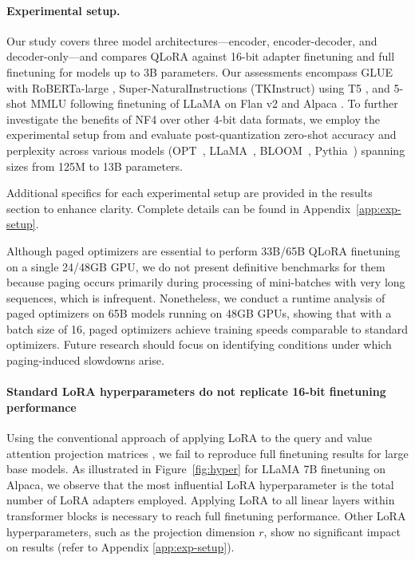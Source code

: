 \paragraph{Experimental setup.} Our study covers three model architectures—encoder, encoder-decoder, and decoder-only—and compares QLoRA against 16-bit adapter finetuning and full finetuning for models up to 3B parameters. Our assessments encompass GLUE \citep{wang2018glue} with RoBERTa-large \citep{liu2019roberta}, Super-NaturalInstructions (TKInstruct) \citep{wang2022super} using T5 \citep{t5}, and 5-shot MMLU \citep{hendrycksmeasuring} following finetuning of LLaMA on Flan v2 \citep{longpre2023flan} and Alpaca \citep{alpaca}. To further investigate the benefits of NF4 over other 4-bit data formats, we employ the experimental setup from \citet{dettmers2022case} and evaluate post-quantization zero-shot accuracy and perplexity across various models (OPT~\citep{zhang2022opt}, LLaMA~\citep{touvron2023llama}, BLOOM~\citep{scao2022bloom}, Pythia~\citep{biderman2023pythia}) spanning sizes from 125M to 13B parameters.

Additional specifics for each experimental setup are provided in the results section to enhance clarity. Complete details can be found in Appendix~\ref{app:exp-setup}.

Although paged optimizers are essential to perform 33B/65B \textsc{QLoRA} finetuning on a single 24/48GB GPU, we do not present definitive benchmarks for them because paging occurs primarily during processing of mini-batches with very long sequences, which is infrequent. Nonetheless, we conduct a runtime analysis of paged optimizers on 65B models running on 48GB GPUs, showing that with a batch size of 16, paged optimizers achieve training speeds comparable to standard optimizers. Future research should focus on identifying conditions under which paging-induced slowdowns arise.

\paragraph{Standard LoRA hyperparameters do not replicate 16-bit finetuning performance}

Using the conventional approach of applying LoRA to the query and value attention projection matrices \citep{hu2021lora}, we fail to reproduce full finetuning results for large base models. As illustrated in Figure~\ref{fig:hyper} for LLaMA 7B finetuning on Alpaca, we observe that the most influential LoRA hyperparameter is the total number of LoRA adapters employed. Applying LoRA to all linear layers within transformer blocks is necessary to reach full finetuning performance. Other LoRA hyperparameters, such as the projection dimension $r$, show no significant impact on results (refer to Appendix \ref{app:exp-setup}).

